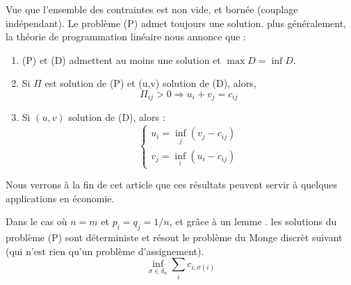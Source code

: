 \documentclass[
    8.2pt,
    a4paper,
    logo,
    twocolumn
]{template}
\renewcommand{\min}{\inf}
\begin{document}
    Vue que l'ensemble des contraintes est non vide, et bornée (couplage indépendant). Le problème (P) admet toujours une solution. plus généralement, la théorie de programmation linéaire nous annonce que :
    \begin{enumerate}[i] \label{refer}
        \item (P) et (D) admettent au moins une solution et $\max D = \min D$.
        \item Si $\Pi$ est solution de (P) et (u,v) solution de (D), alors,
        \[
            \Pi_{ij} > 0 \Rightarrow u_i + v_j = c_{ij}
        \]
        \item Si $(u,v)$ solution de (D), alors :
        \[
            \begin{cases}
                u_i = \min_{j} (v_j - c_{ij}) \\
                v_j = \min_{i} (u_i - c_{ij})
            \end{cases}
        \]
    \end{enumerate}
    Nous verrons à la fin de cet article que ces résultats peuvent servir à quelques applications en économie.

    Dans le cas où $n=m$ et $p_i = q_j = 1/n$, et grâce à un lemme . les solutions du problème (P) sont déterministe et résout le problème du Monge discrèt suivant (qui n'est rien qu'un problème d'assignement).
    \[
        \min_{\sigma \in \delta_n} \sum_{i} c_{i, \sigma(i)}
    \]
\end{document}
